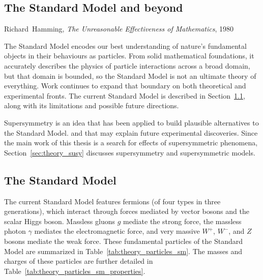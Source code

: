 \begin{singlespacing}
\chapter{The Standard Model and beyond}
\label{chapter:theory}
%
\begin{epigraphs}
%
{Richard~Hamming,
\textit{The Unreasonable Effectiveness of Mathematics},
1980~\cite{hamming1980unreasonable}}
\end{epigraphs}
\end{singlespacing}
\noindent
The Standard Model encodes our best understanding of nature's fundamental
objects in their behaviours as particles.
From solid mathematical foundations, it accurately describes the physics
of particle interactions across a broad domain,
but that domain is bounded, so the Standard Model is not an ultimate theory of
everything.
Work continues to expand that boundary on both theoretical and experimental
fronts.
The current Standard Model is described in Section~\ref{sec:theory_sm},
along with its limitations and possible future directions.

Supersymmetry is an idea that has been applied to build plausible alternatives
to the Standard Model. and that may explain future experimental discoveries.
Since the main work of this thesis is a search for effects of supersymmetric
phenomena, Section~\ref{sec:theory_susy} discusses supersymmetry and
supersymmetric models.


\section{The Standard Model}
\label{sec:theory_sm}
The current Standard Model features fermions
(of four types in three generations),
which interact through forces mediated by vector bosons
and the scalar Higgs boson.
Massless gluons $g$ mediate the strong force,
the massless photon $\gamma$ mediates the electromagnetic force,
and very massive $W^+$, $W^-$, and $Z$ bosons mediate the weak force.
These fundamental particles of the Standard Model are summarized in
Table~\ref{tab:theory_particles_sm}.
The masses and charges of these particles are further detailed in
Table~\ref{tab:theory_particles_sm_properties}.

